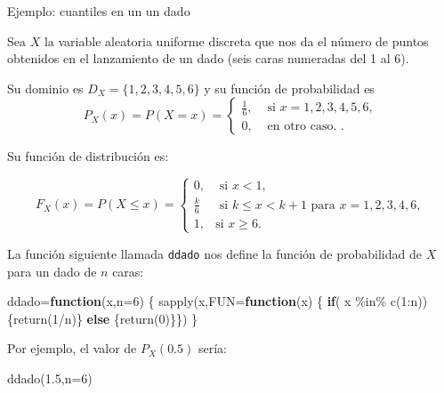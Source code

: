 \documentclass[
  letterpaper,
  DIV=11,
  numbers=noendperiod]{scrreprt}
\newenvironment{Shaded}{\begin{snugshade}}{\end{snugshade}}
\newcommand{\AttributeTok}[1]{\textcolor[rgb]{0.40,0.45,0.13}{#1}}
\newcommand{\ControlFlowTok}[1]{\textcolor[rgb]{0.00,0.23,0.31}{\textbf{#1}}}
\newcommand{\DecValTok}[1]{\textcolor[rgb]{0.68,0.00,0.00}{#1}}
\newcommand{\FloatTok}[1]{\textcolor[rgb]{0.68,0.00,0.00}{#1}}
\newcommand{\FunctionTok}[1]{\textcolor[rgb]{0.28,0.35,0.67}{#1}}
\newcommand{\NormalTok}[1]{\textcolor[rgb]{0.00,0.23,0.31}{#1}}
\newcommand{\OtherTok}[1]{\textcolor[rgb]{0.00,0.23,0.31}{#1}}
\newcommand{\SpecialCharTok}[1]{\textcolor[rgb]{0.37,0.37,0.37}{#1}}
\begin{document}
\begin{Ejemplo}{Ejemplo: cuantiles en un un dado}{}

Sea \(X\) la variable aleatoria uniforme discreta que nos da el número
de puntos obtenidos en el lanzamiento de un dado (seis caras numeradas
del 1 al 6).

Su dominio es \(D_X=\{1,2,3,4,5,6\}\) y su función de probabilidad es \[
P_X(x)=P(X=x)=
\left\{
\begin{array}{ll}
 \frac{1}{6}, & \mbox{ si } x=1,2,3,4,5,6, \\
0, & \mbox{ en otro caso. }.
\end{array}
\right.
\]

Su función de distribución es:

\[
F_X(x)= P(X\leq x)=
\left\{
\begin{array}{ll}
0, & \mbox{ si } x<1, \\
\frac{k}{6} & \mbox{ si } k\leq x< k+1 \mbox{ para } x= 1,2,3,4,6, \\
 1, & \mbox{si } x \geq 6.
\end{array}
\right.
\]

La función siguiente llamada \texttt{ddado} nos define la función de
probabilidad de \(X\) para un dado de \(n\) caras:

\begin{Shaded}
\begin{Highlighting}[]
\NormalTok{ddado}\OtherTok{=}\ControlFlowTok{function}\NormalTok{(x,}\AttributeTok{n=}\DecValTok{6}\NormalTok{) \{}
  \FunctionTok{sapply}\NormalTok{(x,}\AttributeTok{FUN=}\ControlFlowTok{function}\NormalTok{(x) \{}
    \ControlFlowTok{if}\NormalTok{( x }\SpecialCharTok{\%in\%} \FunctionTok{c}\NormalTok{(}\DecValTok{1}\SpecialCharTok{:}\NormalTok{n))\{}\FunctionTok{return}\NormalTok{(}\DecValTok{1}\SpecialCharTok{/}\NormalTok{n)\} }\ControlFlowTok{else}\NormalTok{ \{}\FunctionTok{return}\NormalTok{(}\DecValTok{0}\NormalTok{)\}\})}
\NormalTok{  \}}
\end{Highlighting}
\end{Shaded}

Por ejemplo, el valor de \(P_X(0.5)\) sería:

\begin{Shaded}
\begin{Highlighting}[]
\FunctionTok{ddado}\NormalTok{(}\FloatTok{1.5}\NormalTok{,}\AttributeTok{n=}\DecValTok{6}\NormalTok{)}
\end{Highlighting}
\end{Shaded}


\end{Ejemplo}
\end{document}
